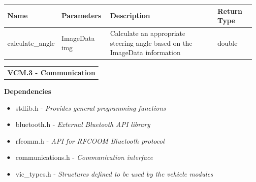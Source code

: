 \documentclass [10pt]{article}
\begin{document}
\begin{longtable}{| p{ }  p{ } p{} p{}|} \hline

 \textbf{Name} & \textbf{Parameters} & \textbf{Description} &\textbf{Return Type} \\ \hline

\rowcolor{tableCell} calculate\_angle & ImageData img & Calculate an appropriate steering angle based on the ImageData information & double \\ \hline


\end{longtable}

 





\begin{longtable}{p{}}
\rowcolor{subsectionC}\textbf{VCM.3 - Communication} \\
\end{longtable}




\textbf{Dependencies} 
\begin{itemize} 
\itemsep 0em 
\item stdlib.h - \textit{Provides general programming functions}
\item bluetooth.h - \textit{External Bluetooth API library}
\item rfcomm.h - \textit{API for RFCOOM Bluetooth protocol}
\item communications.h - \textit{Communication interface}
\item vic\_types.h - \textit{Structures defined to be used by the vehicle modules}
\end{itemize}
\end{document}
